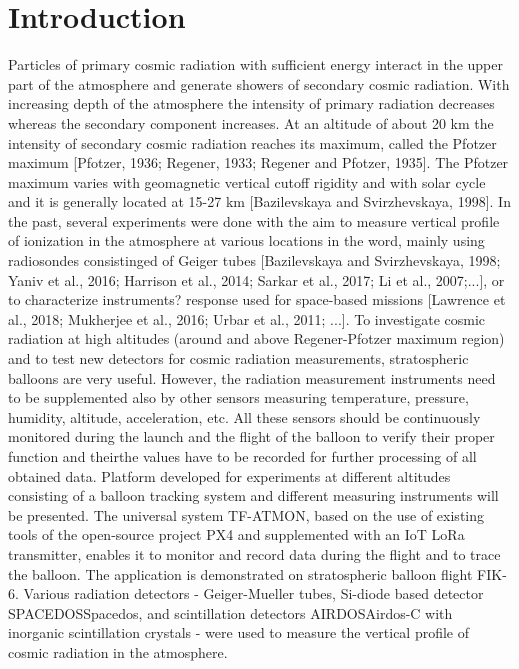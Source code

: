 \documentclass{Rpd}
\begin{document}
\maketitle


\section{Introduction}

Particles of primary cosmic radiation with sufficient energy interact in the upper part of the atmosphere and generate showers of secondary cosmic radiation. With increasing depth of the atmosphere the intensity of primary radiation decreases whereas the secondary component increases. At an altitude of about 20 km the intensity of secondary cosmic radiation reaches its maximum, called the Pfotzer maximum [Pfotzer, 1936; Regener, 1933; Regener and Pfotzer, 1935]. The Pfotzer maximum varies with geomagnetic vertical cutoff rigidity and with solar cycle and it is generally located at 15-27 km [Bazilevskaya and Svirzhevskaya, 1998]. 
In the past, several experiments were done with the aim to measure vertical profile of ionization in the atmosphere at various locations in the word, mainly using radiosondes consistinged of Geiger tubes [Bazilevskaya and Svirzhevskaya, 1998; Yaniv et al., 2016; Harrison et al., 2014; Sarkar et al., 2017; Li et al., 2007;...], or to characterize instruments? response used for space-based missions [Lawrence et al., 2018; Mukherjee et al., 2016; Urbar et al., 2011; ...]. 
To investigate cosmic radiation at high altitudes (around and above Regener-Pfotzer maximum region) and to test new detectors for cosmic radiation measurements, stratospheric balloons are very useful. 
However, the radiation measurement instruments need to be supplemented also by other sensors measuring temperature, pressure, humidity, altitude, acceleration, etc.  All these sensors should be continuously monitored during the launch and the flight of the balloon to verify their proper function and theirthe values have to be recorded for further processing of all obtained data. 
Platform developed for experiments at different altitudes consisting of a balloon tracking system and different measuring instruments will be presented. The universal system TF-ATMON, based on the use of existing tools of the open-source project PX4 and supplemented with an IoT LoRa transmitter, enables it to monitor and record data during the flight and to trace the balloon. The application is demonstrated on stratospheric balloon flight FIK-6. Various radiation detectors - Geiger-Mueller tubes, Si-diode based detector SPACEDOSSpacedos, and scintillation detectors AIRDOSAirdos-C with inorganic scintillation crystals - were used to measure the vertical profile of cosmic radiation in the atmosphere. 
\end{document}
